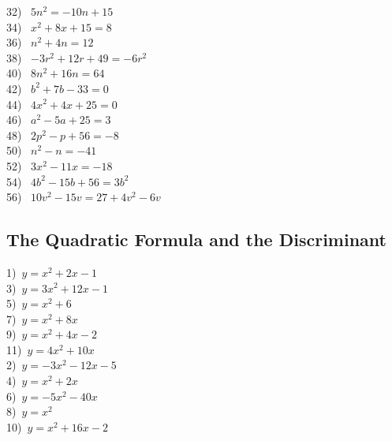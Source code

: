\begin{multicols}{2}
  32)~ $5 n^2 = - 10 n + 15$\\
  34)~ $x^2 + 8 x + 15 = 8$\\
  36)~ $n^2 + 4 n = 12$\\
  38)~ $- 3 r^2 + 12 r + 49 = - 6 r^2$\\
  40)~ $8 n^2 + 16 n = 64$\\
  42)~ $b^2 + 7 b - 33 = 0$\\
  44)~ $4 x^2 + 4 x + 25 = 0$\\
  46)~ $a^2 - 5 a + 25 = 3$\\
  48)~ $2 p^2 - p + 56 = - 8$\\
  50)~ $n^2 - n = - 41$\\
  52)~ $3 x^2 - 11 x = - 18$\\
  54)~ $4 b^2 - 15 b + 56 = 3 b^2$\\
  56)~ $10 v^2 - 15 v = 27 + 4 v^2 - 6 v$\\
\end{multicols}

\newpage

\subsection{The Quadratic Formula and the Discriminant}

{}
\label{QF}
\begin{multicols}{2}
  1)~$y=x^2+2x-1 $\\
  3)~$y=3x^2+12x-1$\\
  5)~$y=x^2+6$\\
  7)~$y=x^2+8x$\\
  9)~$y=x^2+4x-2$\\
  11)~$y=4x^2+10x$\\
	2)~$y=-3x^2-12x-5 $\\
  4)~$y=x^2+2x$\\
  6)~$y=-5x^2-40x$\\
  8)~$y=x^2$\\
  10)~$y=x^2+16x-2 $
\end{multicols}

{}

